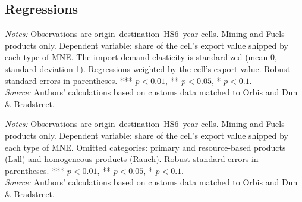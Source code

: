 \documentclass[11pt,a4paper]{article}
\begin{document}
\subsection{Regressions}
\begin{table}[H]\centering\small%
  \caption{Mining and Fuels: Product Characteristics and Multinational Shares}%
  \label{tab:fgo_r_mining}%
  \par\vspace{3pt}%
  \begin{minipage}{0.95\textwidth}\footnotesize %
  \textit{Notes:} Observations are origin--destination--HS6--year cells. Mining and Fuels products only. Dependent variable: share of the cell's export value shipped by each type of MNE. The import-demand elasticity is standardized (mean 0, standard deviation 1). Regressions weighted by the cell's export value. Robust standard errors in parentheses. *** $p<0.01$, ** $p<0.05$, * $p<0.1$.\\[3pt]%
  \textit{Source:} Authors' calculations based on customs data matched to Orbis and Dun \& Bradstreet.%
  \end{minipage}%
  \end{table}
\begin{table}[H]\centering\footnotesize%
  \caption{Mining and Fuels: Product Sophistication and Multinational Shares}%
  \label{tab:meas_r_mining}%
  \par\vspace{3pt}%
  \begin{minipage}{0.95\textwidth}\footnotesize %
  \textit{Notes:} Observations are origin--destination--HS6--year cells. Mining and Fuels products only. Dependent variable: share of the cell's export value shipped by each type of MNE. Omitted categories: primary and resource-based products (Lall) and homogeneous products (Rauch). Robust standard errors in parentheses. *** $p<0.01$, ** $p<0.05$, * $p<0.1$.\\[3pt]%
  \textit{Source:} Authors' calculations based on customs data matched to Orbis and Dun \& Bradstreet.%
  \end{minipage}%
  \end{table}
\end{document}
